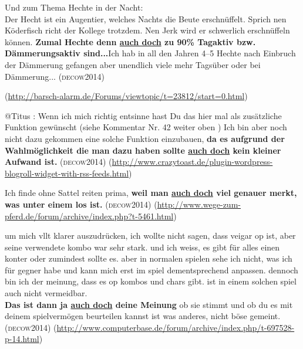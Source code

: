 \begin{exe}
	\ex\label{1181} 

	Und zum Thema Hechte in der Nacht:\\
	Der Hecht ist ein Augentier, welches Nachts die Beute erschnüffelt. Sprich nen Köderfisch richt der Kollege trotzdem. Nen Jerk wird er schwerlich 			erschnüffeln können. \textbf{Zumal Hechte denn \ul{auch doch} zu 90\% Tagaktiv bzw. Dämmerungsaktiv sind...}Ich hab in all den Jahren 4--5 Hechte 	nach Einbruch der Dämmerung gefangen aber unendlich viele mehr Tagsüber oder bei Dämmerung...
	\hfill\hbox{\scshape(decow2014)}	
	\begin{sloppypar}
	{\scriptsize(\url{http://barsch-alarm.de/Forums/viewtopic/t=23812/start=0.html})}\end{sloppypar}
\end{exe}						  
						
\begin{exe}
	\ex\label{1182} 

	@Titus : Wenn ich mich richtig entsinne hast Du das hier mal als zusätzliche Funktion gewünscht (siehe Kommentar Nr. 42 weiter oben ) Ich bin aber noch 	nicht dazu gekommen eine solche Funktion einzubauen, \textbf{da es aufgrund der Wahlmöglichkeit die man dazu haben sollte \ul{auch doch} kein 		kleiner Aufwand ist.} 
	\hfill\hbox{\scshape(decow2014)}	
	\newline
	{\scriptsize(\url{http://www.crazytoast.de/plugin-wordpress-blogroll-widget-with-rss-feeds.html})}
\end{exe}	

\begin{exe}
	\ex\label{1183} 

	Ich finde ohne Sattel reiten prima, \textbf{weil man \ul{auch doch} viel genauer merkt, was unter einem los ist.} 
	\hfill\hbox{\scshape(decow2014)}	
	\newline
	{\scriptsize(\url{http://www.wege-zum-pferd.de/forum/archive/index.php?t-5461.html})}
\end{exe}\largerpage

\begin{exe}
	\ex\label{1184} 

	um mich vllt klarer auszudrücken, ich wollte nicht sagen, dass veigar op ist, aber seine verwendete kombo war sehr stark. und ich weiss, es gibt für 		alles einen konter oder zumindest sollte es. aber in normalen spielen sehe ich nicht, was ich für gegner habe und kann mich erst im spiel 					dem\-entsprechend anpassen. dennoch bin ich der meinung, dass es op kombos und chars gibt. ist in einem solchen spiel auch nicht vermeidbar.\\	
	\noindent
	\textbf{Das ist dann ja \ul{auch doch} deine Meinung} ob sie stimmt und ob du es mit deinem spielvermögen beurteilen kannst ist was anderes, 		nicht böse gemeint.	 
	\hfill\hbox{\scshape(decow2014)}	
	\newline
	{\scriptsize(\url{http://www.computerbase.de/forum/archive/index.php/t-697528-p-14.html})}
\end{exe}

